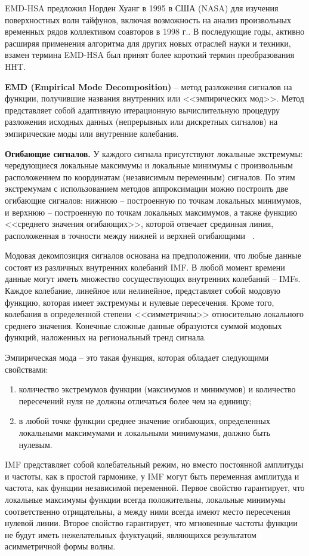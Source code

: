 \documentclass[utf8x, 14pt, oneside, a4paper]{article}
\begin{document}
	EMD-HSA предложил Норден Хуанг в 1995 в США (NASA) для изучения поверхностных волн тайфунов, включая возможность на анализ произвольных временных рядов коллективом соавторов в 1998 г.. В последующие годы, активно расширяя применения алгоритма для других новых отраслей науки и техники, взамен термина EMD-HSA был принят более короткий термин преобразования HHT.
	
	{\bf EMD (Empirical Mode Decomposition)} – метод разложения сигналов на функции, получившие названия внутренних или <<эмпирических мод>>. Метод представляет собой адаптивную итерационную вычислительную процедуру разложения исходных данных (непрерывных или дискретных сигналов) на эмпирические моды или внутренние колебания.
	
	{\bf Огибающие сигналов.} У каждого сигнала присутствуют локальные экстремумы: чередующиеся локальные максимумы и локальные минимумы с произвольным расположением по координатам (независимым переменным) сигналов. По этим экстремумам с использованием методов аппроксимации можно построить две огибающие сигналов: нижнюю – построенную по точкам локальных минимумов, и верхнюю – построенную по точкам локальных максимумов, а также функцию <<среднего значения огибающих>>, которой отвечает срединная линия, расположенная в точности между нижней и верхней огибающими ~\cite{magistr}.
	
	Модовая декомпозиция сигналов основана на предположении, что любые данные состоят из различных внутренних колебаний IMF. В любой момент времени данные могут иметь множество сосуществующих внутренних колебаний – IMFs. Каждое колебание, линейное или нелинейное, представляет собой модовую функцию, которая имеет экстремумы и нулевые пересечения. Кроме того, колебания в определенной степени <<симметричны>> относительно локального среднего значения. Конечные сложные данные образуются суммой модовых функций, наложенных на региональный тренд сигнала.
	
	Эмпирическая мода – это такая функция, которая обладает следующими свойствами:
	\begin{enumerate}
		\item количество экстремумов функции (максимумов и минимумов) и количество пересечений нуля не должны отличаться более чем на единицу;
		\item в любой точке функции среднее значение огибающих, определенных локальными максимумами и локальными минимумами, должно быть нулевым.
	\end{enumerate}

	IMF представляет собой колебательный режим, но вместо постоянной амплитуды и частоты, как в простой гармонике, у IMF могут быть переменная амплитуда и частота, как функции независимой переменной. Первое свойство гарантирует, что локальные максимумы функции всегда положительны, локальные минимумы соответственно отрицательны, а между ними всегда имеют место пересечения нулевой линии. Второе свойство гарантирует, что мгновенные частоты функции не будут иметь нежелательных флуктуаций, являющихся результатом асимметричной формы волны.
	
\end{document}

